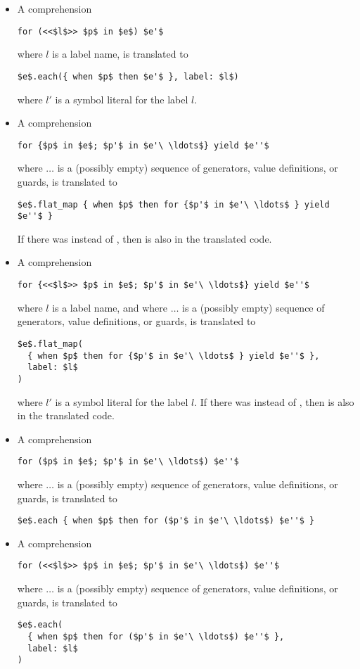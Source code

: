 \begin{itemize}
\item A comprehension 
\begin{lstlisting}
for (<<$l$>> $p$ in $e$) $e'$
\end{lstlisting}
where $l$ is a label name, is translated to
\begin{lstlisting}[deletekeywords={label}]
$e$.each({ when $p$ then $e'$ }, label: $l$)
\end{lstlisting}
where $l'$ is a symbol literal for the label $l$. 

\item A comprehension 
\begin{lstlisting}
for {$p$ in $e$; $p'$ in $e'\ \ldots$} yield $e''$
\end{lstlisting}
where $\ldots$ is a (possibly empty) sequence of generators, value definitions, or guards, is translated to
\begin{lstlisting}
$e$.flat_map { when $p$ then for {$p'$ in $e'\ \ldots$ } yield $e''$ }
\end{lstlisting}
If there was  instead of , then  is also in the translated code. 

\item A comprehension 
\begin{lstlisting}
for {<<$l$>> $p$ in $e$; $p'$ in $e'\ \ldots$} yield $e''$
\end{lstlisting}
where $l$ is a label name, and where $\ldots$ is a (possibly empty) sequence of generators, value definitions, or guards, is translated to
\begin{lstlisting}[deletekeywords={label}]
$e$.flat_map(
  { when $p$ then for {$p'$ in $e'\ \ldots$ } yield $e''$ },
  label: $l$
)
\end{lstlisting}
where $l'$ is a symbol literal for the label $l$. If there was  instead of , then  is also in the translated code. 

\item A comprehension 
\begin{lstlisting}
for ($p$ in $e$; $p'$ in $e'\ \ldots$) $e''$
\end{lstlisting}
where $\ldots$ is a (possibly empty) sequence of generators, value definitions, or guards, is translated to
\begin{lstlisting}
$e$.each { when $p$ then for ($p'$ in $e'\ \ldots$) $e''$ }
\end{lstlisting}

\item A comprehension 
\begin{lstlisting}
for (<<$l$>> $p$ in $e$; $p'$ in $e'\ \ldots$) $e''$
\end{lstlisting}
where $\ldots$ is a (possibly empty) sequence of generators, value definitions, or guards, is translated to
\begin{lstlisting}[deletekeywords={label}]
$e$.each(
  { when $p$ then for ($p'$ in $e'\ \ldots$) $e''$ },
  label: $l$
)
\end{lstlisting}


\end{itemize}
